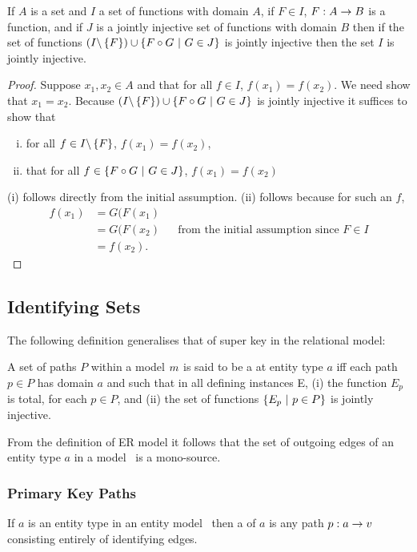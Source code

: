 \begin{lemma}
\label{jointlyinjectivefactorisation}
If $A$ is a set and $I$  a set of functions with domain $A$, if $F \in I$, $F: A \rightarrow B$ is a function,
and if $J$ is a jointly injective set of functions with domain $B$ then if the set of functions
$(I \backslash \left\{F\right\}) \cup \left\{F \circ G \ \middle|\ G \in J\right\}$ is jointly injective then the
set $I$ is jointly injective.
\end{lemma}
\begin{proof}
Suppose $x_1,x_2 \in A$ and that for all $f \in I$, $f(x_1)=f(x_2)$. We need show that $x_1=x_2$.
Because $(I \backslash \left\{F\right\}) \cup \left\{F \circ G \ \middle|\ G \in J\right\}$ is jointly injective
it suffices to show that 
\begin{enumerate}[(i)]
\item
for all $f \in I \backslash \left\{F\right\}$, $f(x_1)=f(x_2)$, 
\item that for all $f \in \left\{F \circ G \ \middle|\ G \in J\right\}$, $f(x_1)=f(x_2)$
\end{enumerate}
(i) follows directly from the initial assumption. 
(ii) follows because for such an $f$, 
\begin{align*}
f(x_1)&=G(F(x_1) & & \\
      &=G(F(x_2) & & \mbox{from the initial assumption since }F \in I \\
			&=f(x_2). & &
\end{align*}
\end{proof}


\subsection{Identifying Sets}

The following definition generalises that of super key in the relational model:
\begin{definition}
A set of paths $P$  within a model ${m}$ is said to be a  at entity type $a$
iff each path $p \in P$ has domain $a$ and such that in all defining instances E, 
(i) the function $E_p$ is total, for each $p \in P$, and (ii) the set of functions
$\left\{E_p \ \middle|\ p\in P\right\}$ is jointly injective.
\end{definition}

From the definition of ER model it follows that the set of outgoing edges of an entity type 
$a$ in a model \genericmodel\ is a mono-source. 
\subsubsection{Primary Key Paths}
\begin{definition}
If $a$ is an entity type in an entity model \genericmodel\ then a 
of $a$ is any path $p:a \rightarrow v$ consisting entirely of identifying edges. 
\end{definition}

